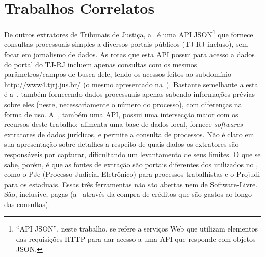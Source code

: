 \chapter{Trabalhos Correlatos~\label{chp:related-work}}

De outros extratores de Tribunais de Justiça, a~\cite{plexi-api} é uma API
JSON\footnote{``API JSON'', neste trabalho, se refere a serviços Web que
utilizam elementos das requisições HTTP para dar acesso a uma API que responde
com objetos JSON.} que fornece consultas processuais simples a diversos portais
públicos (TJ-RJ incluso), sem focar em jornalismo de dados. As rotas que esta
API possui para acesso a dados do portal do TJ-RJ incluem apenas consultas com
os mesmos parâmetros/campos de busca dele, tendo os acessos feitos ao
subdomínio http://www4.tjrj.jus.br/ (o mesmo apresentado
na~). Bastante semelhante a esta é a~\cite{intima.ai},
também fornecendo dados processuais apenas sabendo informações prévias sobre
eles (neste, necessariamente o número do processo), com diferenças na forma de
uso. A~\cite{codilo-api}, também uma API, possui uma intersecção maior com os
recursos deste trabalho: alimenta uma base de dados local, fornece
\textit{softwares} extratores de dados jurídicos, e permite a consulta de
processos. Não é claro em sua apresentação sobre detalhes a respeito de quais
dados os extratores são responsáveis por capturar, dificultando um levantamento
de seus limites. O que se sabe, porém, é que as fontes de extração são portais
diferentes dos utilizados no \tjscraper, como o PJe (Processo Judicial
Eletrônico) para processos trabalhistas e o Projudi para os estaduais. Essas
três ferramentas não são abertas nem de Software-Livre. São, inclusive, pagas
(a~\cite{intima.ai} através da compra de créditos que são gastos ao longo das
consultas).
